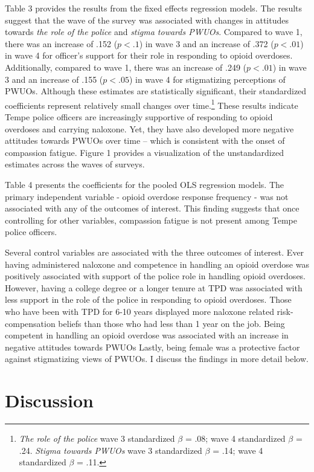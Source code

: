 Table 3 provides the results from the fixed effects regression models. The results suggest that the wave of the survey was associated with changes in attitudes towards \textit{the role of the police} and \textit{stigma towards PWUOs}. Compared to wave 1, there was an increase of .152 (\(p < .1\)) in wave 3 and an increase of .372 (\(p < .01\)) in wave 4 for officer's support for their role in responding to opioid overdoses. Additionally, compared to wave 1, there was an increase of .249 (\(p < .01\)) in wave 3 and an increase of .155 (\(p < .05\)) in wave 4 for stigmatizing perceptions of PWUOs. Although these estimates are statistically significant, their standardized coefficients represent relatively small changes over time.\footnote{\textit{The role of the police} wave 3 standardized \(\beta\) = .08; wave 4 standardized \(\beta\) = .24. \textit{Stigma towards PWUOs} wave 3 standardized \(\beta\) = .14; wave 4 standardized \(\beta\) = .11.} These results indicate Tempe police officers are increasingly supportive of responding to opioid overdoses and carrying naloxone. Yet, they have also developed more negative attitudes towards PWUOs over time – which is consistent with the onset of compassion fatigue. Figure 1 provides a visualization of the unstandardized estimates across the waves of surveys. 

Table 4 presents the coefficients for the pooled OLS regression models. The primary independent variable - opioid overdose response frequency - was not associated with any of the outcomes of interest. This finding suggests that once controlling for other variables, compassion fatigue is not present among Tempe police officers.

Several control variables are associated with the three outcomes of interest. Ever having administered naloxone and competence in handling an opioid overdose was positively associated with support of the police role in handling opioid overdoses. However, having a college degree or a longer tenure at TPD was associated with less support in the role of the police in responding to opioid overdoses. Those who have been with TPD for 6-10 years displayed more naloxone related risk-compensation beliefs than those who had less than 1 year on the job. Being competent in handling an opioid overdose was associated with an increase in negative attitudes towards PWUOs Lastly, being female was a protective factor against stigmatizing views of PWUOs. I discuss the findings in more detail below. 

\section{Discussion}

